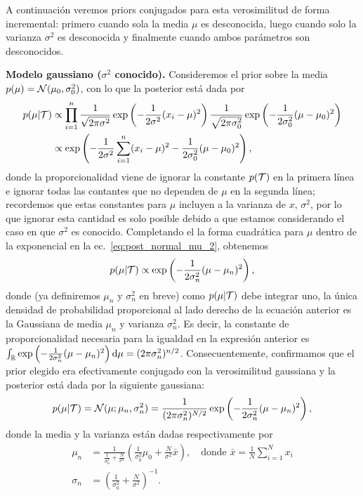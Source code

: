 A continuación veremos priors conjugados para esta verosimilitud de forma incremental: primero cuando sola la media $\mu$ es desconocida, luego cuando solo la varianza $\sigma^2$ es desconocida y finalmente cuando ambos parámetros son desconocidos.  

\textbf{Modelo gaussiano ($\sigma^2$ conocido).} Consideremos el prior sobre la media $p(\mu) = {\mathcal N}(\mu_0,\sigma_0^2)$, con lo que la posterior está dada por  
 \begin{align}
 	p(\mu|{\mathcal T}) &\propto \prod_{i=1}^n \frac{1}{\sqrt{2\pi\sigma^2}}\exp\left(-\frac{1}{2\sigma^2}(x_i-\mu)^2\right) \frac{1}{\sqrt{2\pi\sigma_0^2}}\exp\left(-\frac{1}{2\sigma_0^2}(\mu-\mu_0)^2\right)\label{eq:post_normal_mu_1}\\
 	&\propto \exp\left(-\frac{1}{2\sigma^2}\sum_{i=1}^n(x_i-\mu)^2-\frac{1}{2\sigma_0^2}(\mu-\mu_0)^2\right),\label{eq:post_normal_mu_2}
 \end{align} 
 donde la proporcionalidad viene de ignorar la constante $p({\mathcal T})$ en la primera línea e ignorar todas las contantes que no dependen de $\mu$ en la segunda línea; recordemos que estas constantes para $\mu$ incluyen a la varianza de $x$, $\sigma^2$, por lo que ignorar esta cantidad es solo posible debido a que estamos considerando el caso en que $\sigma^2$ es conocido. Completando el la forma cuadrática para $\mu$ dentro de la exponencial en la ec.~\eqref{eq:post_normal_mu_2}, obtenemos
 \begin{equation}
 	p(\mu|{\mathcal T}) \propto \exp\left(-\frac{1}{2\sigma_n^2}(\mu - \mu_n)^2\right),\label{eq:post_normal_mu_3}
 \end{equation} 
 donde (ya definiremos $\mu_n$ y $\sigma_n^2$ en breve) como $p(\mu|{\mathcal T})$ debe integrar uno, la única densidad de probabilidad proporcional al lado derecho de la ecuación anterior es la Gaussiana de media $\mu_n$ y varianza $\sigma_n^2$. Es decir, la constante de proporcionalidad necesaria para la igualdad en la expresión anterior es $\int_{\mathbb R}\exp\left(-\frac{1}{2\sigma_n^2}(\mu - \mu_n)^2\right){\text d}\mu = (2\pi\sigma_n^2)^{n/2}$. Consecuentemente, confirmamos que el prior elegido era efectivamente conjugado con la verosimilitud gaussiana y la posterior está dada por la siguiente gaussiana:
  \begin{equation}
 	p(\mu|{\mathcal T}) = {\mathcal N}(\mu;\mu_n,\sigma_n^2) = \frac{1}{(2\pi\sigma_n^2)^{N/2}}\exp\left(-\frac{1}{2\sigma_n^2}(\mu - \mu_n)^2\right),\label{eq:post_normal_mu_4}
 \end{equation} 
 donde la media y la varianza están dadas respectivamente  por 
 \begin{align}
 	\mu_n &= \frac{1}{\tfrac{1}{\sigma_0^2} + \tfrac{N}{\sigma^2}} \left(\frac{1}{\sigma_0^2}\mu_0 + \frac{N}{\sigma^2}\bar{x} \right), \quad \text{donde } \bar{x} = \frac{1}{N}\sum_{i=1}^N x_i\label{eq:post_Gm}\\
 	\sigma_n &= \left(\frac{1}{\sigma_0^2} + \frac{N}{\sigma^2}\right)^{-1}.\label{eq:post_Gv}
 \end{align}

